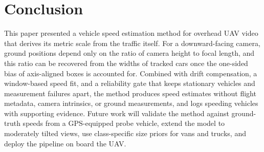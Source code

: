 \documentclass[conference]{IEEEtran}
\begin{document}

\section{Conclusion}

This paper presented a vehicle speed estimation method for overhead UAV video that derives its metric scale from the traffic itself. For a downward-facing camera, ground positions depend only on the ratio of camera height to focal length, and this ratio can be recovered from the widths of tracked cars once the one-sided bias of axis-aligned boxes is accounted for. Combined with drift compensation, a window-based speed fit, and a reliability gate that keeps stationary vehicles and measurement failures apart, the method produces speed estimates without flight metadata, camera intrinsics, or ground measurements, and logs speeding vehicles with supporting evidence. Future work will validate the method against ground-truth speeds from a GPS-equipped probe vehicle, extend the model to moderately tilted views, use class-specific size priors for vans and trucks, and deploy the pipeline on board the UAV.

%
\end{document}

